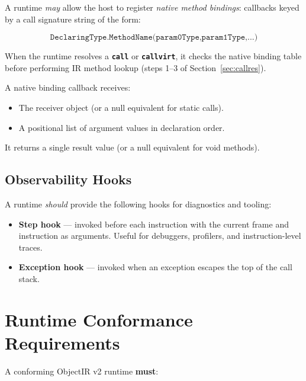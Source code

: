 \documentclass[11pt,a4paper]{article}
\newcommand{\opcode}[1]{\textbf{\texttt{#1}}}
\begin{document}
A runtime \textit{may} allow the host to register \emph{native method
bindings}: callbacks keyed by a call signature string of the form:

\[
\texttt{DeclaringType.MethodName(param0Type,param1Type,...)}
\]

When the runtime resolves a \opcode{call} or \opcode{callvirt}, it checks
the native binding table before performing IR method lookup (steps 1--3 of
Section~\ref{sec:callres}).

A native binding callback receives:
\begin{itemize}[leftmargin=1.8em, noitemsep]
  \item The receiver object (or a null equivalent for static calls).
  \item A positional list of argument values in declaration order.
\end{itemize}

It returns a single result value (or a null equivalent for void methods).

\subsection{Observability Hooks}

A runtime \textit{should} provide the following hooks for diagnostics and
tooling:

\begin{itemize}[leftmargin=1.8em]
  \item \textbf{Step hook} --- invoked before each instruction with the
    current frame and instruction as arguments. Useful for debuggers,
    profilers, and instruction-level traces.
  \item \textbf{Exception hook} --- invoked when an exception escapes the
    top of the call stack.
\end{itemize}

\section{Runtime Conformance Requirements}
\label{sec:conformance}

A conforming ObjectIR v2 runtime \textbf{must}:
\end{document}
